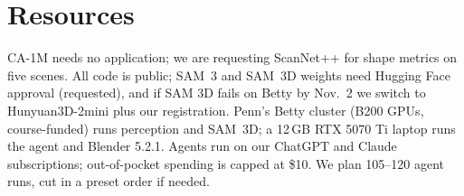 \documentclass[11pt]{article}
\begin{document}
\section*{Resources}
CA-1M needs no application; we are requesting ScanNet++ for shape metrics on five scenes. All code is public; SAM~3 and SAM~3D weights need Hugging Face approval (requested), and if SAM 3D fails on Betty by Nov.~2 we switch to \mbox{Hunyuan3D-2mini} plus our registration. Penn's Betty cluster (B200 GPUs, course-funded) runs perception and SAM~3D; a 12\,GB RTX 5070 Ti laptop runs the agent and Blender 5.2.1. Agents run on our ChatGPT and Claude subscriptions; out-of-pocket spending is capped at \$10. We plan 105--120 agent runs, cut in a preset order if needed.
\end{document}
